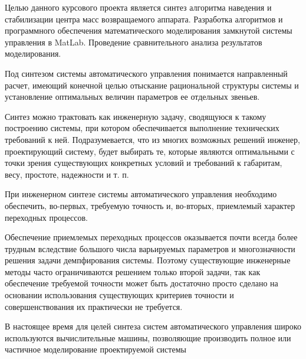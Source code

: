 
Целью данного курсового проекта является синтез алгоритма наведения и стабилизации центра масс возвращаемого аппарата. Разработка алгоритмов и программного обеспечения математического моделирования замкнутой системы управления в MatLab. Проведение сравнительного анализа результатов моделирования.


Под синтезом системы автоматического управления понимается направленный расчет, имеющий конечной целью отыскание рациональной структуры системы и установление оптимальных величин параметров ее отдельных звеньев. 

Синтез можно трактовать как инженерную задачу, сводящуюся к такому построению системы, при котором обеспечивается выполнение технических требований к ней. Подразумевается, что из многих возможных решений инженер, проектирующий систему, будет выбирать те, которые являются оптимальными с точки зрения существующих конкретных условий и требований к габаритам, весу, простоте, надежности и т. п.

При инженерном синтезе системы автоматического управления необходимо обеспечить, во-первых, требуемую точность и, во-вторых, приемлемый характер переходных процессов.

Обеспечение приемлемых переходных процессов оказывается почти всегда более трудным вследствие большого числа варьируемых параметров и многозначности решения задачи демпфирования системы. Поэтому существующие инженерные методы часто ограничиваются решением только второй задачи, так как обеспечение требуемой точности может быть достаточно просто сделано на основании использования существующих критериев точности и совершенствования их практически не требуется.

В настоящее время для целей синтеза систем автоматического управления широко используются вычислительные машины, позволяющие производить полное или частичное моделирование проектируемой системы
\clearpage